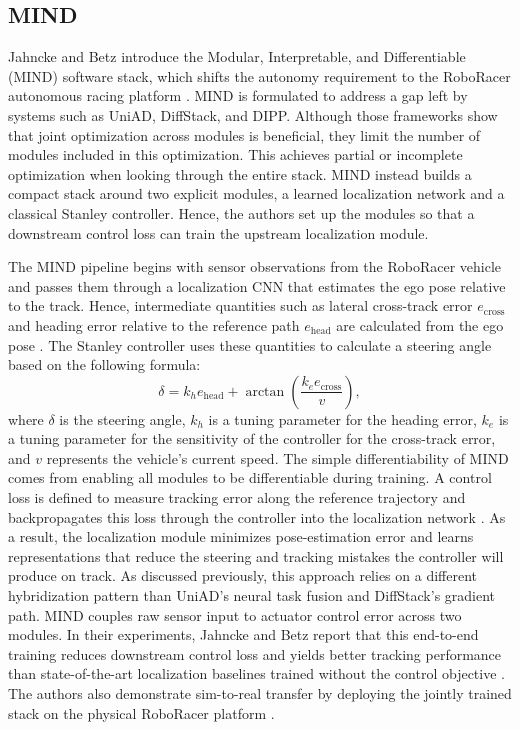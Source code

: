 \subsection{MIND}
\label{subsection:MIND}

Jahncke and Betz \cite{jahncke_MINDStackModularInterpretable_2025} introduce the Modular, Interpretable, and Differentiable (MIND) software stack, which shifts the autonomy requirement to the RoboRacer autonomous racing platform \cite{betz_TUMAutonomousMotorsport_2023, okelly_F1TENTHOpensourceEvaluation_2019}.
MIND is formulated to address a gap left by systems such as UniAD, DiffStack, and DIPP.
Although those frameworks show that joint optimization across modules is beneficial, they limit the number of modules included in this optimization.
This achieves partial or incomplete optimization when looking through the entire stack. 
MIND instead builds a compact stack around two explicit modules, a learned localization network and a classical Stanley controller.
Hence, the authors set up the modules so that a downstream control loss can train the upstream localization module.

The MIND pipeline begins with sensor observations from the RoboRacer vehicle and passes them through a localization CNN that estimates the ego pose relative to the track.
Hence, intermediate quantities such as lateral cross-track error $e_{\text{cross}}$ and heading error relative to the reference path $e_{\text{head}}$ are calculated from the ego pose \cite{jahncke_MINDStackModularInterpretable_2025}.
The Stanley controller uses these quantities to calculate a steering angle based on the following formula:
\begin{equation}
    \delta = k_h e_{\text{head}} + \arctan \left(\frac{k_e e_{\text{cross}}}{v}\right),
\end{equation}
where $\delta$ is the steering angle, $k_h$ is a tuning parameter for the heading error, $k_e$ is a tuning parameter for the sensitivity of the controller for the cross-track error, and $v$ represents the vehicle's current speed.
The simple differentiability of MIND comes from enabling all modules to be differentiable during training.
A control loss is defined to measure tracking error along the reference trajectory and backpropagates this loss through the controller into the localization network \cite{jahncke_MINDStackModularInterpretable_2025}.
As a result, the localization module minimizes pose-estimation error and learns representations that reduce the steering and tracking mistakes the controller will produce on track.
As discussed previously, this approach relies on a different hybridization pattern than UniAD's neural task fusion and DiffStack's gradient path. 
MIND couples raw sensor input to actuator control error across two modules.
In their experiments, Jahncke and Betz report that this end-to-end training reduces downstream control loss and yields better tracking performance than state-of-the-art localization baselines trained without the control objective \cite{jahncke_MINDStackModularInterpretable_2025}.
The authors also demonstrate sim-to-real transfer by deploying the jointly trained stack on the physical RoboRacer platform \cite{jahncke_MINDStackModularInterpretable_2025}.

